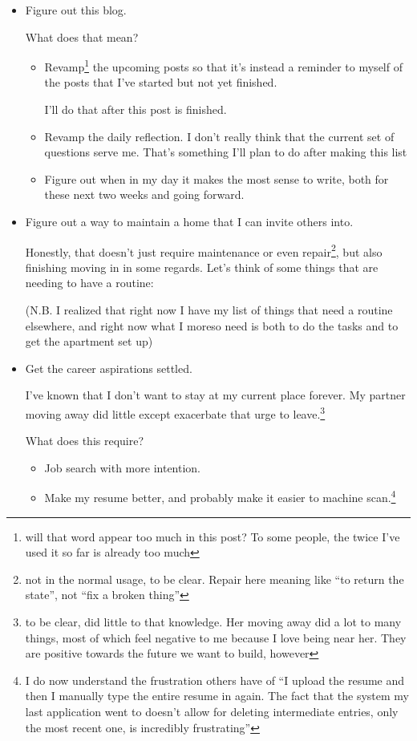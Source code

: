 \documentclass[12pt]{article}
\newcommand{\say}[1]{``#1''}
\renewcommand{\,}{\textsuperscript{,}}
\begin{document}
\begin{itemize}

\item Figure out this blog.

What does that mean?  
\begin{itemize}  
\item Revamp\footnote{will that word appear too much in this post? To some people, the twice I've used it so far is already too much} the upcoming posts so that it's instead a reminder to myself of the posts that I've started but not yet finished.

I'll do that after this post is finished.

\item Revamp the daily reflection. I don't really think that the current set of questions serve me. That's something I'll plan to do after making this list

\item Figure out when in my day it makes the most sense to write, both for these next two weeks and going forward.  
\end{itemize}

\item Figure out a way to maintain a home that I can invite others into.

Honestly, that doesn't just require maintenance or even repair\footnote{not in the normal usage, to be clear. Repair here meaning like \say{to return the state}, not \say{fix a broken thing}}, but also finishing moving in in some regards.  
Let's think of some things that are needing to have a routine:

(N.B. I realized that right now I have my list of things that need a routine elsewhere, and right now what I moreso need is both to do the tasks and to get the apartment set up)

\item Get the career aspirations settled.

I've known that I don't want to stay at my current place forever. My partner moving away did little except exacerbate that urge to leave.\footnote{to be clear, did little to that knowledge. Her moving away did a lot to many things, most of which feel negative to me because I love being near her. They are positive towards the future we want to build, however}

What does this require?  
\begin{itemize}

\item Job search with more intention.  
\item Make my resume better, and probably make it easier to machine scan.\footnote{I do now understand the frustration others have of \say{I upload the resume and then I manually type the entire resume in again. The fact that the system my last application went to doesn't allow for deleting intermediate entries, only the most recent one, is incredibly frustrating}}


\end{itemize}
\end{itemize}
\end{document}
